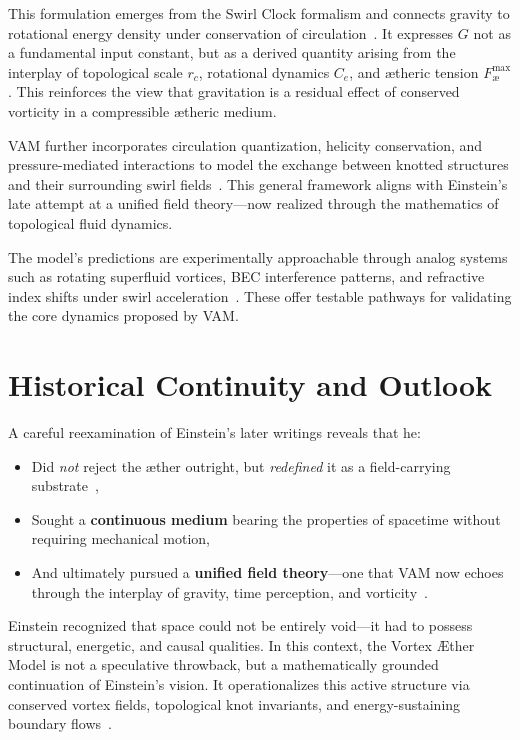 \documentclass[preprint,notitlepage]{revtex4-2}
\begin{document}
This formulation emerges from the Swirl Clock formalism and connects gravity to rotational energy density under conservation of circulation~\cite{VAM-2, VAM-13}. It expresses $G$ not as a fundamental input constant, but as a derived quantity arising from the interplay of topological scale $r_c$, rotational dynamics $C_e$, and ætheric tension $F^{\max}_{\text{\ae}}$. This reinforces the view that gravitation is a residual effect of conserved vorticity in a compressible ætheric medium.

VAM further incorporates circulation quantization, helicity conservation, and pressure-mediated interactions to model the exchange between knotted structures and their surrounding swirl fields~\cite{VAM-8, VAM-11, VAM-14}. This general framework aligns with Einstein’s late attempt at a unified field theory—now realized through the mathematics of topological fluid dynamics.

The model's predictions are experimentally approachable through analog systems such as rotating superfluid vortices, BEC interference patterns, and refractive index shifts under swirl acceleration~\cite{VAM-2, VAM-13}. These offer testable pathways for validating the core dynamics proposed by VAM.

\vspace{1em}

\section{Historical Continuity and Outlook}

A careful reexamination of Einstein's later writings reveals that he:
\begin{itemize}
    \item Did \emph{not} reject the æther outright, but \emph{redefined} it as a field-carrying substrate~\cite{einstein1920aether},
    \item Sought a \textbf{continuous medium} bearing the properties of spacetime without requiring mechanical motion,
    \item And ultimately pursued a \textbf{unified field theory}—one that VAM now echoes through the interplay of gravity, time perception, and vorticity~\cite{VAM-8, VAM-14}.
\end{itemize}

Einstein recognized that space could not be entirely void—it had to possess structural, energetic, and causal qualities. In this context, the Vortex Æther Model is not a speculative throwback, but a mathematically grounded continuation of Einstein's vision. It operationalizes this active structure via conserved vortex fields, topological knot invariants, and energy-sustaining boundary flows~\cite{VAM-8, VAM-11, VAM-14}.
\end{document}
